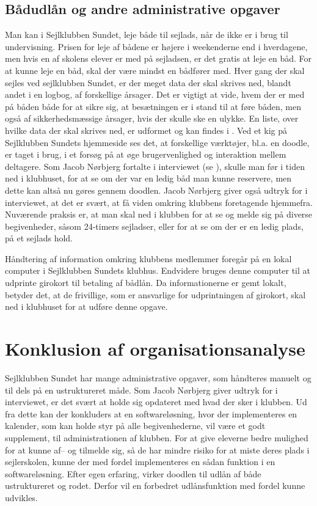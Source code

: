 \subsection{Bådudlån og andre administrative opgaver}\label{subsec:bådudlån}

Man kan i Sejlklubben Sundet, leje både til sejlads, når de ikke er i brug til undervisning. 
Prisen for leje af bådene er højere i weekenderne end i hverdagene, men hvis en af skolens elever er med på sejladsen, er det gratis at leje en båd. 
For at kunne leje en båd, skal der være mindst en bådfører med.
Hver gang der skal sejles ved sejlklubben Sundet, er der meget data der skal skrives ned, blandt andet i en logbog, af forskellige årsager. Det er vigtigt at vide, hvem der er med på båden både for at sikre sig, at besætningen er i stand til at føre båden, men også af sikkerhedsmæssige årsager, hvis der skulle ske en ulykke. 
En liste, over hvilke data der skal skrives ned, er udformet og kan findes i . 
Ved et kig på Sejlklubben Sundets hjemmeside \citep{SundetUdlaan} ses det, at forskellige værktøjer, bl.a. en doodle, er taget i brug, i et forsøg på at øge brugervenlighed og interaktion mellem deltagere. 
Som Jacob Nørbjerg fortalte i interviewet (se ), skulle man før i tiden ned i klubhuset, for at se om der var en ledig båd man kunne reservere, men dette kan altså nu gøres gennem doodlen. Jacob Nørbjerg  giver også udtryk for i interviewet, at det er svært, at få viden omkring klubbens foretagende hjemmefra. 
Nuværende praksis er, at man skal ned i klubben for at se og melde sig på diverse begivenheder, såsom 24-timers sejladser, eller for at se om der er en ledig plads, på et sejlads hold.

Håndtering af information omkring klubbens medlemmer foregår på en lokal computer i Sejlklubben Sundets
klubhus. Endvidere bruges denne computer til at udprinte girokort til betaling af bådlån. Da informationerne
er gemt lokalt, betyder det, at de frivillige, som er ansvarlige for udprintningen af girokort, skal ned i
klubhuset for at udføre denne opgave.


\section{Konklusion af organisationsanalyse}\label{sec:organisation-konklusion}

Sejlklubben Sundet har mange administrative opgaver, som håndteres manuelt og til dels på en ustruktureret
måde. 
Som Jacob Nørbjerg giver udtryk for i interviewet, er det svært at holde sig opdateret med hvad der sker i klubben. Ud fra dette kan der konkluders at en softwareløsning, hvor der implementeres en kalender, som kan holde styr på alle begivenhederne, vil være et godt supplement, til administrationen af klubben. 
For at give eleverne bedre mulighed for at kunne af-- og tilmelde sig, så de har mindre risiko for at miste deres plads i sejlerskolen, kunne der med fordel implementeres en sådan funktion i en softwareløsning. 
Efter egen erfaring, virker doodlen til udlån af både ustruktureret og rodet. 
Derfor vil en forbedret udlånsfunktion med fordel kunne udvikles.

